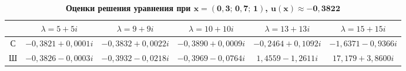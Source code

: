     \begin{table}[h!]

        \footnotesize

        \setlength{\tabcolsep}{1pt}

        \begin{minipage}[t]{135mm}

            \caption{\bf Оценки решения уравнения при $\boldsymbol{x=(0{,}3;\,  0{,}7;\,  1)}$,  $\boldsymbol{u(x)\approx-0{,}3822}$}\label{kuznetsov:solEst1}\vspace{-3mm}

            \begin{tabular}{c|c|c|c|c|c}

              \hline

              &$\lambda=5+5i$&$\lambda=9+9i$&$\lambda=10+10i$&$\lambda=13+13i$&$\lambda=15+15i$\\

              \hline

              С&$-0{,}3821+0{,}0001i$&$-0{,}3832+0{,}0022i$&$-0{,}3890+0{,}0009i$&$-0{,}2464+0{,}1092i$&$-1{,}6371-0{,}9366i$\\

              \hline

              Ш&$-0{,}3826-0{,}0003i$&$-0{,}3932-0{,}0218i$&$-0{,}3969-0{,}0764i$&$1{,}4559-1{,}2611i$&$17{,}179+3{,}8600i$\\

              \hline

            \end{tabular}

        \end{minipage}

    \end{table}





